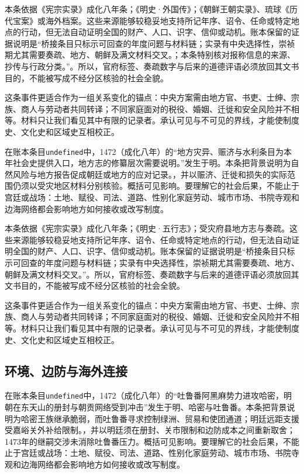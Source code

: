 本条依据《宪宗实录》成化八年条；《明史·外国传》；《朝鲜王朝实录》、琉球《历代宝案》或海外档案。这些来源能够较稳妥地支持所记年序、诏令、任命或特定地点的行动，但无法自动证明全国的财产、人口、识字、信仰或动机。账本保留的证据说明是“桥接条目只标示可回查的年度问题与材料链；实录有中央选择性，崇祯期尤其需要奏疏、地方、朝鲜及满文材料交叉。；本条特别核对报称信息的来源、抄传与行政分类。”。所以，官府标签、奏疏数字与后来的道德评语必须放回其文书目的，不能被写成不经分区核验的社会全貌。

这条事件更适合作为一组关系变化的锚点：中央方案需由地方官、书吏、士绅、宗族、商人与劳动者共同转译；不同家庭面对的税役、婚姻、迁徙和安全风险并不相等。材料只让我们看见其中有限的记录者。承认可见与不可见的界线，才能使制度史、文化史和区域史互相校正。

在账本条目\texttt{undefined}中，1472（成化八年）的“地方灾异、赈济与水利条目为本年社会史提供入口，地方志的修纂层次需要说明。”发生于明。本条把背景说明为自然风险与地方报告促成朝廷或地方的应对记录。，并以赈济、迁徙和损失的实际范围仍须以受灾地区材料分别核验。概括可见影响。要理解它的社会后果，不能止于宫廷或战场：土地、赋役、司法、道路、性别化家庭劳动、城市市场、书院寺观和边海网络都会影响地方如何接收或改写制度。

本条依据《宪宗实录》成化八年条；《明史·五行志》；受灾府县地方志与奏疏。这些来源能够较稳妥地支持所记年序、诏令、任命或特定地点的行动，但无法自动证明全国的财产、人口、识字、信仰或动机。账本保留的证据说明是“桥接条目只标示可回查的年度问题与材料链；实录有中央选择性，崇祯期尤其需要奏疏、地方、朝鲜及满文材料交叉。”。所以，官府标签、奏疏数字与后来的道德评语必须放回其文书目的，不能被写成不经分区核验的社会全貌。

这条事件更适合作为一组关系变化的锚点：中央方案需由地方官、书吏、士绅、宗族、商人与劳动者共同转译；不同家庭面对的税役、婚姻、迁徙和安全风险并不相等。材料只让我们看见其中有限的记录者。承认可见与不可见的界线，才能使制度史、文化史和区域史互相校正。

\subsection{环境、边防与海外连接}

在账本条目\texttt{undefined}中，1472（成化八年）的“吐鲁番阿黑麻势力进攻哈密，明朝在东天山的册封与朝贡网络受到冲击”发生于明、哈密与吐鲁番。本条把背景说明为哈密王族继承脆弱，而吐鲁番寻求控制绿洲、贸易和使团通道；明廷远距支援受嘉峪关外补给限制。，并以明廷须在册封、关市限制和边防成本之间重新取舍；1473年的继嗣交涉未消除吐鲁番压力。概括可见影响。要理解它的社会后果，不能止于宫廷或战场：土地、赋役、司法、道路、性别化家庭劳动、城市市场、书院寺观和边海网络都会影响地方如何接收或改写制度。

